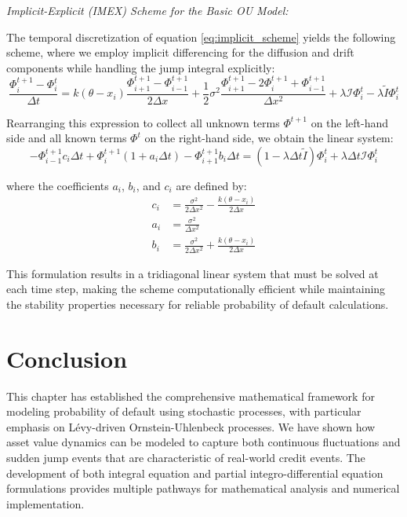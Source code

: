 \documentclass[11pt,twoside,openright]{report}
\begin{document}
\textit{Implicit-Explicit (IMEX) Scheme for the Basic OU Model:}

The temporal discretization of equation \eqref{eq:implicit_scheme} yields the following scheme, where we employ implicit differencing for the diffusion and drift components while handling the jump integral explicitly:
$$ \frac{\Phi^{t+1}_i - \Phi^t_i}{\Delta t} = k(\theta - x_i)\frac{\Phi^{t+1}_{i+1} - \Phi^{t+1}_{i-1}}{2\Delta x} + \frac{1}{2}\sigma^2 \frac{\Phi^{t+1}_{i+1} - 2\Phi^{t+1}_i + \Phi^{t+1}_{i-1}}{\Delta x^2} + \lambda\mathcal{I}\Phi^t_i - \lambda\tilde{I}\Phi^t_i $$

Rearranging this expression to collect all unknown terms $\Phi^{t+1}$ on the left-hand side and all known terms $\Phi^t$ on the right-hand side, we obtain the linear system:
$$ -\Phi^{t+1}_{i-1} c_i \Delta t + \Phi^{t+1}_i (1 + a_i \Delta t) - \Phi^{t+1}_{i+1} b_i \Delta t = (1 - \lambda \Delta t \tilde{I})\Phi^t_i + \lambda \Delta t \mathcal{I}\Phi^t_i $$

where the coefficients $a_i$, $b_i$, and $c_i$ are defined by:
\begin{align}
c_i &= \frac{\sigma^2}{2\Delta x^2} - \frac{k(\theta - x_i)}{2\Delta x} \\
a_i &= \frac{\sigma^2}{\Delta x^2} \\
b_i &= \frac{\sigma^2}{2\Delta x^2} + \frac{k(\theta - x_i)}{2\Delta x}
\end{align}

This formulation results in a tridiagonal linear system that must be solved at each time step, making the scheme computationally efficient while maintaining the stability properties necessary for reliable probability of default calculations.

\section{Conclusion}
\label{sec:conclusion_chapter2}

This chapter has established the comprehensive mathematical framework for modeling probability of default using stochastic processes, with particular emphasis on Lévy-driven Ornstein-Uhlenbeck processes. We have shown how asset value dynamics can be modeled to capture both continuous fluctuations and sudden jump events that are characteristic of real-world credit events. The development of both integral equation and partial integro-differential equation formulations provides multiple pathways for mathematical analysis and numerical implementation.
\end{document}
